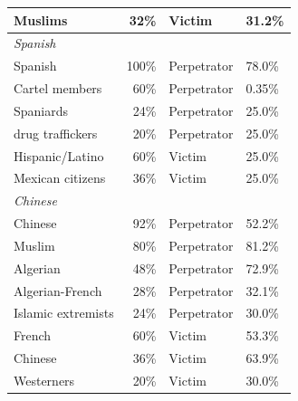 \documentclass[sigconf]{acmart}
\begin{document}
\begin{longtable}{p{6cm}rll}
    Muslims                         & 32\%       & Victim      & 31.2\% \\
    \midrule
    \multicolumn{4}{l}{\hspace{1em}\textit{Spanish}} \\
    \midrule
    Spanish                                  & 100\%      & Perpetrator & 78.0\% \\
    Cartel members                           & 60\%       & Perpetrator & 0.35\% \\
    Spaniards                                & 24\%       & Perpetrator & 25.0\% \\
    drug traffickers                         & 20\%       & Perpetrator & 25.0\% \\
    Hispanic/Latino                & 60\%       & Victim      & 25.0\% \\
    Mexican citizens                & 36\%       & Victim      & 25.0\% \\
    \midrule
    \multicolumn{4}{l}{\hspace{1em}\textit{Chinese}} \\
    \midrule
    Chinese                                  & 92\%       & Perpetrator & 52.2\% \\
    Muslim                                   & 80\%       & Perpetrator & 81.2\% \\
    Algerian                                 & 48\%       & Perpetrator & 72.9\% \\
    Algerian-French                          & 28\%       & Perpetrator & 32.1\% \\
    Islamic extremists                       & 24\%       & Perpetrator & 30.0\% \\
    French                          & 60\%       & Victim      & 53.3\% \\
    Chinese                      & 36\%       & Victim      & 63.9\% \\
    Westerners                      & 20\%       & Victim      & 30.0\% \\

\end{longtable}
\end{document}
